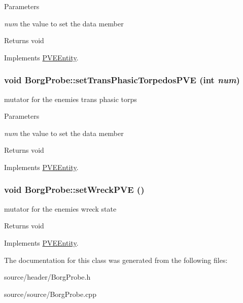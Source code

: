 \begin{DoxyParams}{Parameters}
\item[{\em num}]the value to set the data member\end{DoxyParams}
\begin{DoxyReturn}{Returns}
void 
\end{DoxyReturn}


Implements \hyperlink{classPVEEntity}{PVEEntity}.

\hypertarget{classBorgProbe_ade7cc51b7c80a763a1f6c28e0770266e}{
\subsubsection[{setTransPhasicTorpedosPVE}]{\setlength{\rightskip}{0pt plus 5cm}void BorgProbe::setTransPhasicTorpedosPVE (int {\em num})}}
\label{db/deb/classBorgProbe_ade7cc51b7c80a763a1f6c28e0770266e}
mutator for the enemies trans phasic torps


\begin{DoxyParams}{Parameters}
\item[{\em num}]the value to set the data member\end{DoxyParams}
\begin{DoxyReturn}{Returns}
void 
\end{DoxyReturn}


Implements \hyperlink{classPVEEntity}{PVEEntity}.

\hypertarget{classBorgProbe_a6b4c0d1bdfc717349fd1e74ac710a7da}{
\subsubsection[{setWreckPVE}]{\setlength{\rightskip}{0pt plus 5cm}void BorgProbe::setWreckPVE ()}}
\label{db/deb/classBorgProbe_a6b4c0d1bdfc717349fd1e74ac710a7da}
mutator for the enemies wreck state

\begin{DoxyReturn}{Returns}
void 
\end{DoxyReturn}


Implements \hyperlink{classPVEEntity}{PVEEntity}.



The documentation for this class was generated from the following files:\begin{DoxyCompactItemize}
\item 
source/header/BorgProbe.h\item 
source/source/BorgProbe.cpp\end{DoxyCompactItemize}
